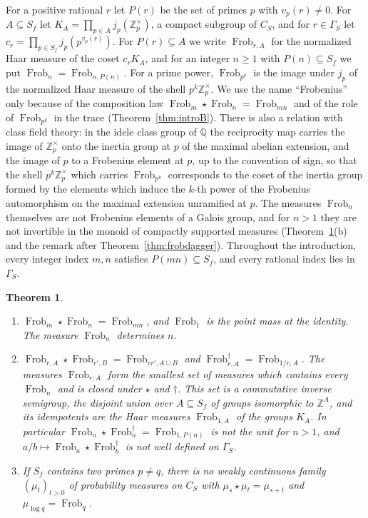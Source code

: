 \documentclass[11pt]{amsart}
\newtheorem{theorem}{Theorem}[section]
\theoremstyle{definition}
\newcommand{\Z}{\mathbb Z}
\newcommand{\Q}{\mathbb Q}
\newcommand{\Frob}{\operatorname{Frob}}
\begin{document}
For a positive rational $r$ let $P(r)$ be the set of primes $p$ with
$v_p(r)\ne0$. For $A\subseteq S_f$ let $K_A=\prod_{p\in A}j_p(\Z_p^\times)$, a
compact subgroup of $C_S$, and for $r\in\Gamma_S$ let
$c_r=\prod_{p\in S_f}j_p(p^{v_p(r)})$. For $P(r)\subseteq A$ we write
$\Frob_{r,A}$ for the normalized Haar measure of the coset $c_rK_A$, and for
an integer $n\ge1$ with $P(n)\subseteq S_f$ we put $\Frob_n=\Frob_{n,P(n)}$.
For a prime power, $\Frob_{p^k}$ is the image under $j_p$ of the normalized
Haar measure of the shell $p^k\Z_p^\times$. We use the name ``Frobenius''
only because of the composition law $\Frob_m\star\Frob_n=\Frob_{mn}$ and of
the role of $\Frob_{p^k}$ in the trace (Theorem~\ref{thm:introB}). There
is also a relation with class field theory: in the idele class group of $\Q$
the reciprocity map carries the image of $\Z_p^\times$ onto the inertia group
at $p$ of the maximal abelian extension, and the image of $p$ to a Frobenius
element at $p$, up to the convention of sign, so that the shell
$p^k\Z_p^\times$ which carries $\Frob_{p^k}$ corresponds to the coset of the
inertia group formed by the elements which induce the $k$-th power of the
Frobenius automorphism on the maximal extension unramified at $p$. The
measures $\Frob_n$ themselves
are not Frobenius elements of a Galois group, and for $n>1$ they are
not invertible in the monoid of compactly supported measures
(Theorem~\ref{thm:introA}(b) and the remark after
Theorem~\ref{thm:frobdagger}). Throughout the introduction,
every integer index $m,n$ satisfies $P(mn)\subseteq S_f$, and every rational
index lies in $\Gamma_S$.

\begin{theorem}\label{thm:introA}
\begin{enumerate}
\item[(a)] $\Frob_m\star\Frob_n=\Frob_{mn}$, and $\Frob_1$ is the point mass
at the identity. The measure $\Frob_n$ determines $n$.
\item[(b)] $\Frob_{r,A}\star\Frob_{r',B}=\Frob_{rr',A\cup B}$ and
$\Frob_{r,A}^\dagger=\Frob_{1/r,A}$. The measures $\Frob_{r,A}$ form the
smallest set of measures which contains every $\Frob_n$ and is closed under
$\star$ and $\dagger$. This set is a commutative inverse semigroup, the
disjoint union over $A\subseteq S_f$ of groups isomorphic to $\Z^A$, and its
idempotents are the Haar measures $\Frob_{1,A}$ of the groups $K_A$. In
particular $\Frob_n\star\Frob_n^\dagger=\Frob_{1,P(n)}$ is not the unit for
$n>1$, and $a/b\mapsto\Frob_a\star\Frob_b^\dagger$ is not well defined on
$\Gamma_S$.
\item[(c)] If $S_f$ contains two primes $p\ne q$, there is no weakly
continuous family $(\mu_t)_{t>0}$ of probability measures on $C_S$ with
$\mu_s\star\mu_t=\mu_{s+t}$ and $\mu_{\log q}=\Frob_q$.
\end{enumerate}
\end{theorem}
\end{document}
